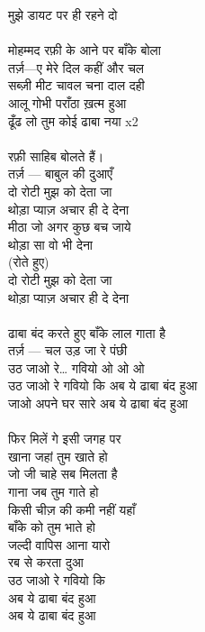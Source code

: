 {{मुझे डायट पर ही रहने दो\\
\\
मोहम्मद रफ़ी के आने पर बाँके बोला\\
तर्ज़—ए मेरे दिल कहीं और चल\\
सब्ज़ी मीट चावल चना दाल दही\\
आलू गोभी पराँठा ख़त्म हुआ\\
ढूँढ लो तुम कोई ढाबा नया x2\\
\\
रफ़ी साहिब बोलते हैं।\\
तर्ज़ — बाबुल की दुआएँ\\
दो रोटी मुझ को देता जा\\
थोड़ा प्याज़ अचार ही दे देना\\
मीठा जो अगर कुछ बच जाये\\
थोड़ा सा वो भी देना\\
(रोते हुए)\\
दो रोटी मुझ को देता जा\\
थोड़ा प्याज़ अचार ही दे देना\\
\\
ढाबा बंद करते हुए बाँके लाल गाता है\\
तर्ज़ — चल उड़ जा रे पंछी\\
उठ जाओ रे… गवियो ओ ओ ओ\\
उठ जाओ रे गवियो कि अब ये ढाबा बंद हुआ\\
जाओ अपने घर सारे अब ये ढाबा बंद हुआ\\
\\
फिर मिलें गे इसी जगह पर\\
खाना जहां तुम खाते हो\\
जो जी चाहे सब मिलता है\\
गाना जब तुम गाते हो\\
किसी चीज़ की कमी नहीं यहाँ\\
बाँके को तुम भाते हो\\
जल्दी वापिस आना यारो\\
रब से करता दुआ\\
उठ जाओ रे गवियो कि\\
अब ये ढाबा बंद हुआ\\
अब ये ढाबा बंद हुआ\\
\\
\\
}}
